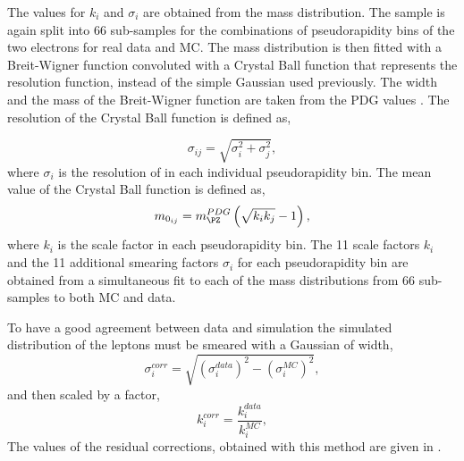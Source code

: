 The values for $k_{i}$ and $\sigma_{i}$ are obtained from the
\HepProcess{\PZ\to\Pe\Pe} mass distribution. The \HepProcess{\PZ\to\Pe\Pe}
sample is again split into 66 sub-samples for the combinations of
pseudorapidity bins of the two electrons for real data
and {MC}.  The \HepProcess{\PZ\to\Pe\Pe} mass distribution is then fitted with a
Breit-Wigner function convoluted with a Crystal Ball function that represents
the resolution function, instead of the simple Gaussian used previously. The
width and the mass of the Breit-Wigner function are taken from the PDG values
\cite{beringer2012review}. The resolution of the Crystal Ball function is
defined as,

\begin{equation}
\sigma_{ij} = \sqrt{\sigma_{i}^{2} + \sigma_{j}^{2}} ,
\end{equation}
where $\sigma_{i}$ is the resolution of in each individual pseudorapidity bin.
The mean value of the Crystal Ball function is defined as,
\begin{equation}
m_{0_{ij}} = m_{\PZ}^{PDG} 
          \left( \sqrt{k_{i} k_{j}} - 1 \right) ,
\end{equation}
where $k_{i}$ is the scale factor in each pseudorapidity bin.  The 11 scale
factors $k_{i}$ and the 11 additional smearing factors $\sigma_{i}$ for each
pseudorapidity bin are obtained from a simultaneous fit to each of the mass
distributions from 66 sub-samples to both {MC} and data. 

To have a good agreement between data and simulation the simulated \pT
distribution of the leptons must be smeared with a Gaussian of width,
\begin{equation}
\sigma^{corr}_{i} = 
\sqrt{
\left(\sigma^{data}_{i}\right)^{2} -
\left(\sigma^{MC}_{i}  \right)^{2} 
},
\end{equation}
and then scaled by a factor,
\begin{equation}
k^{corr}_i = \frac{ k^{data}_i}{k^{MC}_i} ,
\end{equation}
The values of the
residual corrections, obtained with this method are given in
.


